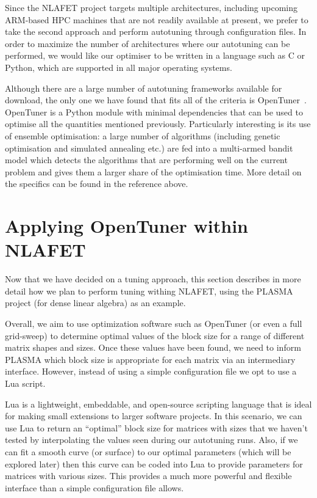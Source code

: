 \documentclass[a4paper,12pt]{article}
\begin{document}
Since the NLAFET project targets multiple architectures,
including upcoming ARM-based HPC machines that are not readily
available at present,
we prefer to take the second approach and perform autotuning
through configuration files.
In order to maximize the number of architectures where our
autotuning can be performed,
we would like our optimiser to be written in a language such as
C or Python, which are supported in all major operating systems.

Although there are a large number of autotuning frameworks
available for download,
the only one we have found that fits all of the criteria is
OpenTuner~\cite{ansel:pact:2014}.
OpenTuner is a Python module with minimal dependencies that
can be used to optimise all the quantities mentioned previously.
Particularly interesting is its use of ensemble optimisation:
a large number of algorithms
(including genetic optimisation and simulated annealing etc.)
are fed into a multi-armed bandit model
which detects the algorithms that are performing well on the current
problem and gives them a larger share of the optimisation time.
More detail on the specifics can be found in the reference above.

\section{Applying OpenTuner within NLAFET}
\label{sec:opentuner}
Now that we have decided on a tuning approach,
this section describes in more detail how we plan to
perform tuning withing NLAFET,
using the PLASMA project (for dense linear algebra)
as an example.

Overall,
we aim to use optimization software such as OpenTuner
(or even a full grid-sweep)
to determine optimal values of the block size for
a range of different matrix shapes and sizes.
Once these values have been found,
we need to inform PLASMA which block size is appropriate for
each matrix via an intermediary interface.
However,
instead of using a simple configuration file
we opt to use a Lua script.

Lua is a lightweight, embeddable, and open-source scripting language
that is ideal for making small extensions to larger software projects.
In this scenario,
we can use Lua to return an ``optimal'' block size for matrices with
sizes that we haven't tested by interpolating the values seen
during our autotuning runs.
Also,
if we can fit a smooth curve (or surface) to our optimal parameters
(which will be explored later)
then this curve can be coded into Lua to
provide parameters for matrices with various sizes.
This provides a much more powerful and flexible interface
than a simple configuration file allows.
\end{document}
